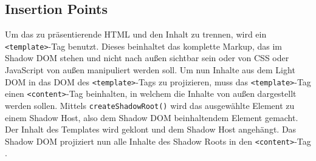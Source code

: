 \subsection{Insertion Points}\label{insertion-points}

Um das zu präsentierende HTML und den Inhalt zu trennen, wird ein \texttt{\textless{}template\textgreater{}}-Tag benutzt. Dieses beinhaltet das komplette Markup, das im Shadow DOM stehen und nicht nach außen sichtbar sein oder von CSS oder JavaScript von außen manipuliert werden soll. Um nun Inhalte aus dem Light DOM in das DOM des \texttt{\textless{}template\textgreater{}}-Tags zu projizieren, muss das \texttt{\textless{}template\textgreater{}}-Tag einen \texttt{\textless{}content\textgreater{}}-Tag beinhalten, in welchem die Inhalte von außen dargestellt werden sollen. Mittels \texttt{createShadowRoot()} wird das ausgewählte Element zu einem Shadow Host, also dem Shadow DOM beinhaltendem Element gemacht. Der Inhalt des Templates wird geklont und dem Shadow Host angehängt. Das Shadow DOM projiziert nun alle Inhalte des Shadow Roots in den \texttt{\textless{}content\textgreater{}}-Tag \cite{citeulike:13851404}.

\begin{Shaded}
\begin{Highlighting}[]
\KeywordTok{>}
\KeywordTok{>}
  \KeywordTok{>}
\end{Highlighting}
\end{Shaded}

\begin{Shaded}
\begin{Highlighting}[]
 \OperatorTok{=} \NormalTok{(}\NormalTok{()}\OperatorTok{;}
 \OperatorTok{=} \NormalTok{(}\NormalTok{)}\OperatorTok{;}
 \OperatorTok{=} \NormalTok{(}\OperatorTok{,} \NormalTok{)}\OperatorTok{;}
\OperatorTok{;}
\end{Highlighting}
\end{Shaded}

